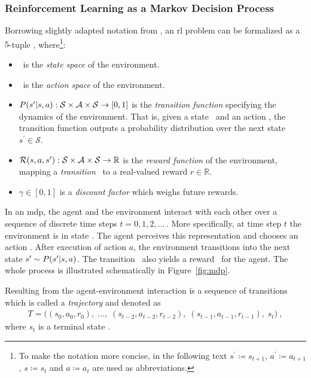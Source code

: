 \subsubsection{Reinforcement Learning as a Markov Decision Process}\label{sssec:mdp}
Borrowing slightly adapted notation from \cite{francois-lavetIntroductionDeepReinforcement2018}, an \gls{rl} problem can be formalized as a $5$-tuple \mdptuple, where\footnote{To make the notation more concise, in the following text $s^\prime \coloneqq s_{t+1}$, $a^\prime \coloneqq a_{t+1}$, $s \coloneqq s_t$ and $a \coloneqq a_t$ are used as abbreviations.}:
\begin{itemize}
    \item \statespace\ is the \emph{state space} of the environment.
    \item \actionspace\ is the \emph{action space} of the environment.
    \item $\transitionfunc: \statespace \times \actionspace \times \statespace \rightarrow [0, 1]$ is the \emph{transition function} specifying the dynamics of the environment. That is, given a state \state\ and an action \action, the transition function outputs a probability distribution over the next state $s^\prime \in \mathcal S$.
    \item $\rewardfunc: \statespace \times \actionspace \times \statespace \rightarrow \mathbb R$  is the \emph{reward function} of the environment, mapping a \emph{transition} \transition\ to a real-valued reward $r \in \mathbb R$.
    \item $\gamma \in [0, 1]$ is a \emph{discount factor} which weighs future rewards. 
\end{itemize}
In an \gls{mdp}, the agent and the environment interact with each other over a sequence of discrete time steps $t=0, 1, 2, \ldots \,$. More specifically, at time step $t$ the environment is in state \state. The agent perceives this representation and chooses an action \action. After execution of action $a$, the environment transitions into the next state $s^\prime \sim \transitionfunc$. The transition \transition~also yields a reward \rewardfunc\ for the agent. The whole process is illustrated schematically in Figure~\ref{fig:mdp}. 

Resulting from the agent-environment interaction is a sequence of transitions which is called a \emph{trajectory} and denoted as
\begin{gather}\label{eq:trajectory}
    T = \big( (s_0, a_0, r_0), \; \ldots, \;( s_{t-2}, a_{t-2}, r_{t-2}), \; (s_{t-1}, a_{t-1}, r_{t-1}), \; s_t  \big)~,
\end{gather}
where $s_t$ is a terminal state \cite{francois-lavetIntroductionDeepReinforcement2018}.

